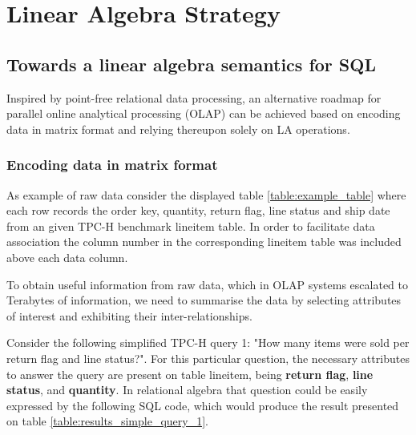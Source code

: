 \section{Linear Algebra Strategy}
\label{strategy}
\indent
\subsection{Towards a linear algebra semantics for SQL}

Inspired by point-free relational data processing, an alternative roadmap for parallel online analytical processing (OLAP) can be achieved based on encoding data in matrix format and relying thereupon solely on LA operations\cite{macedo2011middle}. 

\subsubsection{Encoding data in matrix format}

As example of raw data consider the displayed table \ref{table:example_table} where each row records the order key, quantity, return flag, line status and ship date from an given TPC-H benchmark lineitem table. In order to facilitate data association the column number in the corresponding lineitem table was included above each data column.


To obtain useful information from raw data, which in OLAP systems escalated to Terabytes of information, we need to summarise the data by selecting attributes of interest and exhibiting their inter-relationships.\par 
Consider the following simplified TPC-H query 1: "How many items were sold per return flag and line status?". For this particular question, the necessary attributes to answer the query are present on table lineitem, being \textbf{return flag}, \textbf{line status}, and \textbf{quantity}. In relational algebra that question could be easily expressed by the following SQL code, which would produce the result presented on table \ref{table:results_simple_query_1}.





